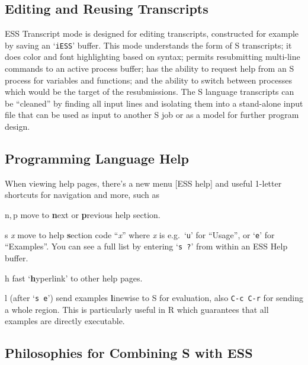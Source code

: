 \documentclass{article}
\newcommand{\stexttt}[1]{{\small\texttt{#1}}}
\newcommand{\file}[1]{`\stexttt{#1}'}
\begin{document}
\subsection{Editing and Reusing Transcripts}
\label{sec:S:trans}

ESS Transcript mode is designed for editing transcripts, constructed for
example by saving an \file{iESS} buffer.  This mode understands the form
of S transcripts; it does color and font highlighting based on syntax;
permits resubmitting multi-line commands to an active process buffer;
has the ability to request help from an S process for variables and
functions; and the ability to switch between processes which would be
the target of the resubmissions.  The S language transcripts can be
``cleaned'' by finding all input lines and isolating them into a
stand-alone input file that can be used as input to another S job or as
a model for further program design.

\subsection{Programming Language Help}
\label{sec:S:help}

When viewing help pages, there's a new menu \textsf{[ESS help]} and
useful 1-letter shortcuts for navigation and more, such as
\begin{list}{}{\renewcommand{\makelabel}[1]{\bf#1\hfill}}
 \item[n,\,p] move to \textbf{n}ext or \textbf{p}revious help section.
 \item[{s \textit{x}}] move to help \textbf{s}ection code ``\textit{x}''
  where \textit{x} is e.g.\ `\stexttt{u}' for ``Usage'', or
  `\stexttt{e}' for ``Examples''.  You can see a full list by entering
  `\stexttt{s ?}' from within an ESS Help buffer.
 \item[h] fast `\textbf{h}yperlink' to other help pages.
 \item[l] (after `\stexttt{s e}') send examples \textbf{l}inewise to S
  for evaluation, also \stexttt{C-c C-r} for sending a whole region.
  This is particularly useful in R which guarantees that all examples
  are directly executable.
\end{list}

\subsection{Philosophies for Combining S with ESS}
\label{sec:S:philosophy}
\end{document}
